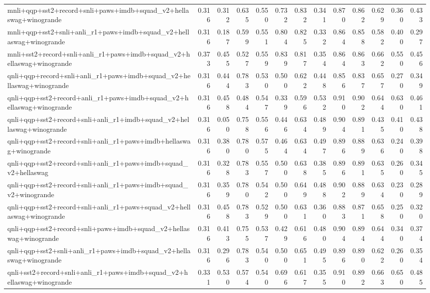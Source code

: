 \begin{table}[t]
\begin{tabular}{lrrrrrrrrrrrr}
    mnli+qqp+sst2+record+snli+paws+imdb+squad\_v2+hellaswag+winogrande & 0.316 & 0.312 & 0.635 & 0.550 & 0.732 & 0.832 & 0.341 & 0.870 & 0.862 & 0.629 & 0.360 & 0.433 \\
    mnli+qqp+sst2+snli+anli\_r1+paws+imdb+squad\_v2+hellaswag+winogrande & 0.316 & 0.187 & 0.599 & 0.551 & 0.804 & 0.825 & 0.332 & 0.864 & 0.858 & 0.582 & 0.400 & 0.297 \\
    mnli+sst2+record+snli+anli\_r1+paws+imdb+squad\_v2+hellaswag+winogrande & 0.373 & 0.455 & 0.527 & 0.559 & 0.839 & 0.817 & 0.354 & 0.864 & 0.863 & 0.662 & 0.550 & 0.456 \\
    qnli+qqp+record+snli+anli\_r1+paws+imdb+squad\_v2+hellaswag+winogrande & 0.316 & 0.444 & 0.783 & 0.530 & 0.500 & 0.622 & 0.448 & 0.856 & 0.837 & 0.657 & 0.270 & 0.349 \\
    qnli+qqp+sst2+record+anli\_r1+paws+imdb+squad\_v2+hellaswag+winogrande & 0.316 & 0.458 & 0.484 & 0.547 & 0.339 & 0.596 & 0.532 & 0.910 & 0.902 & 0.644 & 0.630 & 0.461 \\
    qnli+qqp+sst2+record+snli+anli\_r1+imdb+squad\_v2+hellaswag+winogrande & 0.316 & 0.050 & 0.758 & 0.556 & 0.446 & 0.634 & 0.489 & 0.904 & 0.891 & 0.435 & 0.410 & 0.438 \\
    qnli+qqp+sst2+record+snli+anli\_r1+paws+imdb+hellaswag+winogrande & 0.316 & 0.380 & 0.780 & 0.575 & 0.464 & 0.634 & 0.497 & 0.896 & 0.889 & 0.636 & 0.240 & 0.398 \\
    qnli+qqp+sst2+record+snli+anli\_r1+paws+imdb+squad\_v2+hellaswag & 0.316 & 0.328 & 0.783 & 0.557 & 0.500 & 0.638 & 0.385 & 0.896 & 0.891 & 0.635 & 0.260 & 0.345 \\
    qnli+qqp+sst2+record+snli+anli\_r1+paws+imdb+squad\_v2+winogrande & 0.316 & 0.359 & 0.780 & 0.542 & 0.500 & 0.649 & 0.488 & 0.902 & 0.889 & 0.634 & 0.230 & 0.289 \\
    qnli+qqp+sst2+record+snli+anli\_r1+paws+squad\_v2+hellaswag+winogrande & 0.316 & 0.458 & 0.783 & 0.529 & 0.500 & 0.631 & 0.360 & 0.883 & 0.871 & 0.658 & 0.250 & 0.320 \\
    qnli+qqp+sst2+record+snli+paws+imdb+squad\_v2+hellaswag+winogrande & 0.316 & 0.413 & 0.755 & 0.537 & 0.429 & 0.616 & 0.480 & 0.904 & 0.894 & 0.644 & 0.340 & 0.374 \\
    qnli+qqp+sst2+snli+anli\_r1+paws+imdb+squad\_v2+hellaswag+winogrande & 0.316 & 0.296 & 0.783 & 0.540 & 0.500 & 0.651 & 0.495 & 0.896 & 0.890 & 0.622 & 0.260 & 0.354 \\
    qnli+sst2+record+snli+anli\_r1+paws+imdb+squad\_v2+hellaswag+winogrande & 0.331 & 0.530 & 0.574 & 0.540 & 0.696 & 0.617 & 0.355 & 0.910 & 0.892 & 0.663 & 0.650 & 0.485 \\

\end{tabular}
\end{table}
